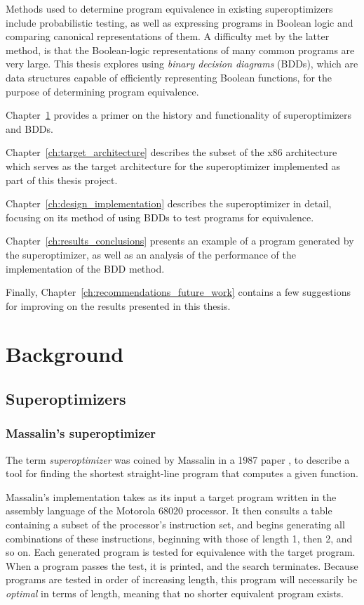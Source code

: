 \documentclass[a4paper,11pt]{kth-mag}
\begin{document}
Methods used to determine program equivalence in existing superoptimizers include probabilistic testing, as well as expressing programs in Boolean logic and comparing canonical representations of them.
A difficulty met by the latter method, is that the Boolean-logic representations of many common programs are very large.
This thesis explores using \emph{binary decision diagrams} (BDDs), which are data structures capable of efficiently representing Boolean functions, for the purpose of determining program equivalence.

Chapter~\ref{ch:background} provides a primer on the history and functionality of superoptimizers and BDDs.

Chapter~\ref{ch:target_architecture} describes the subset of the x86 architecture which serves as the target architecture for the superoptimizer implemented as part of this thesis project.

Chapter~\ref{ch:design_implementation} describes the superoptimizer in detail, focusing on its method of using BDDs to test programs for equivalence.

Chapter~\ref{ch:results_conclusions} presents an example of a program generated by the superoptimizer, as well as an analysis of the performance of the implementation of the BDD method.

Finally, Chapter~\ref{ch:recommendations_future_work} contains a few suggestions for improving on the results presented in this thesis.


\chapter{Background}
\label{ch:background}

\section{Superoptimizers}

\subsection{Massalin's superoptimizer}

The term \emph{superoptimizer} was coined by Massalin in a 1987 paper \cite{massalin87}, to describe a tool for finding the shortest straight-line program that computes a given function.

Massalin's implementation takes as its input a target program written in the assembly language of the Motorola 68020 processor.
It then consults a table containing a subset of the processor's instruction set, and begins generating all combinations of these instructions, beginning with those of length 1, then 2, and so on.
Each generated program is tested for equivalence with the target program.
When a program passes the test, it is printed, and the search terminates.
Because programs are tested in order of increasing length, this program will necessarily be \emph{optimal} in terms of length, meaning that no shorter equivalent program exists.
\end{document}
